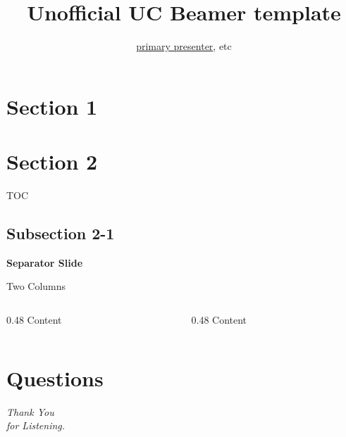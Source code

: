 \documentclass[aspectratio=169, 169]{beamer}
\title{Unofficial UC Beamer template}
\author{\underline{primary presenter}, etc}
\begin{document}
\section{Section 1}

\begin{frame}
    \titlepage
\end{frame}

\section{Section 2}
\begin{frame}{TOC}
	\tableofcontents
\end{frame}
\subsection{Subsection 2-1}


\begin{frame}{}
    \centering
    \Huge{\textbf{Separator Slide}}
\end{frame}


\begin{frame}{Two Columns}
    \begin{columns}
        \begin{column}{0.48\linewidth}
            Content
        \end{column}
        \begin{column}{0.48\linewidth}
           Content
        \end{column}
    \end{columns}
\end{frame}



\section{Questions}
\begin{frame}
\centering \Huge
\emph{Thank You\\for Listening.}
\end{frame}
\end{document}
